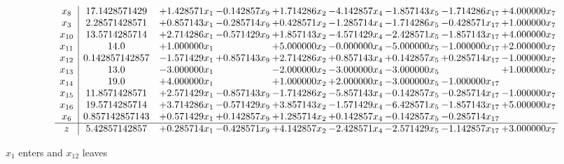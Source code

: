 \documentclass[10pt]{article}
\begin{document}
 \[\begin{array}{c| c c@{\hskip 2pt} c@{\hskip 2pt} c@{\hskip 2pt} c@{\hskip 2pt} c@{\hskip 2pt} c@{\hskip 2pt} c@{\hskip 2pt} }
 x_{8}   &  17.1428571429 & + 1.428571 x_{1} & -0.142857 x_{9} & + 1.714286 x_{2} & -4.142857 x_{4} & -1.857143 x_{5} & -1.714286 x_{17} & + 4.000000 x_{7}\\
 x_{3}   &  2.28571428571 & + 0.857143 x_{1} & -0.285714 x_{9} & + 0.428571 x_{2} & -1.285714 x_{4} & -1.714286 x_{5} & -0.428571 x_{17} & + 1.000000 x_{7}\\
 x_{10}   &  13.5714285714 & + 2.714286 x_{1} & -0.571429 x_{9} & + 1.857143 x_{2} & -4.571429 x_{4} & -2.428571 x_{5} & -1.857143 x_{17} & + 4.000000 x_{7}\\
 x_{11}   &  14.0 & + 1.000000 x_{1} &   & + 5.000000 x_{2} & -0.000000 x_{4} & -5.000000 x_{5} & -1.000000 x_{17} & + 2.000000 x_{7}\\
 x_{12}   &  0.142857142857 & -1.571429 x_{1} & + 0.857143 x_{9} & + 2.714286 x_{2} & + 0.857143 x_{4} & + 0.142857 x_{5} & + 0.285714 x_{17} & -1.000000 x_{7}\\
 x_{13}   &  13.0 & -3.000000 x_{1} &   & -2.000000 x_{2} & -3.000000 x_{4} & -3.000000 x_{5} &   & + 1.000000 x_{7}\\
 x_{14}   &  19.0 & + 4.000000 x_{1} &   & + 1.000000 x_{2} & + 2.000000 x_{4} & -3.000000 x_{5} & -1.000000 x_{17} &   \\
 x_{15}   &  11.8571428571 & + 2.571429 x_{1} & -0.857143 x_{9} & -1.714286 x_{2} & -5.857143 x_{4} & -0.142857 x_{5} & -0.285714 x_{17} & -1.000000 x_{7}\\
 x_{16}   &  19.5714285714 & + 3.714286 x_{1} & -0.571429 x_{9} & + 3.857143 x_{2} & -1.571429 x_{4} & -6.428571 x_{5} & -1.857143 x_{17} & + 5.000000 x_{7}\\
 x_{6}   &  0.857142857143 & + 0.571429 x_{1} & + 0.142857 x_{9} & + 1.285714 x_{2} & + 0.142857 x_{4} & -0.142857 x_{5} & -0.285714 x_{17} &   \\
\hline
z    &  5.42857142857 & + 0.285714 x_{1} & -0.428571 x_{9} & + 4.142857 x_{2} & -2.428571 x_{4} & -2.571429 x_{5} & -1.142857 x_{17} & + 3.000000 x_{7}\\
\end{array}\]


 $ x_{1} $ enters and $ x_{12} $ leaves 
\end{document}
